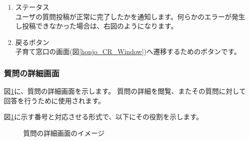\documentclass[a4j]{jarticle}
\begin{document}
\begin{enumerate}
  \renewcommand{\labelenumi}{\textcircled{\scriptsize \theenumi}}
  \item ステータス\\
        ユーザの質問投稿が正常に完了したかを通知します。何らかのエラーが発生し投稿できなかった場合は、右図のようになります。
  \item 戻るボタン\\
        子育て窓口の画面(図\ref{honjo_CR_Window})へ遷移するためのボタンです。
\end{enumerate}


\newpage
\subsubsection{質問の詳細画面}
図\ref{honjo_CR_Answer}に、質問の詳細画面を示します。
質問の詳細を閲覧、またその質問に対して回答を行うために使用されます。

図\ref{honjo_CR_Answer}に示す番号と対応させる形式で、以下にその役割を示します。

\begin{figure}[H]
    \begin{center}
    \caption {質問の詳細画面のイメージ}
    \label{honjo_CR_Answer}
    \end{center}
\end{figure}
\end{document}
